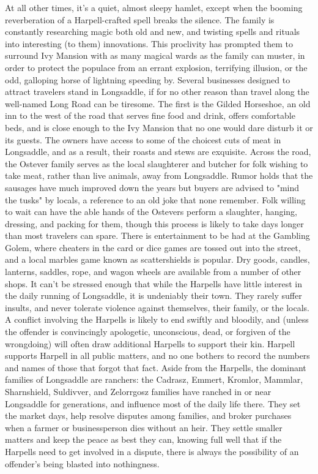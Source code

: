 \documentclass[10pt,a4paper,twoside,twocolumn,openany,bg=print,nodeprecatedcode]{dndbook}
\begin{document}
At all other times, it's a quiet, almost sleepy hamlet, except when the booming reverberation of a Harpell-crafted spell breaks the silence. The family is constantly researching magic both old and new, and twisting spells and rituals into interesting (to them) innovations. This proclivity has prompted them to surround Ivy Mansion with as many magical wards as the family can muster, in order to protect the populace from an errant explosion, terrifying illusion, or the odd, galloping horse of lightning speeding by.
Several businesses designed to attract travelers stand in Longsaddle, if for no other reason than travel along the well-named Long Road can be tiresome. The first is the Gilded Horseshoe, an old inn to the west of the road that serves fine food and drink, offers comfortable beds, and is close enough to the Ivy Mansion that no one would dare disturb it or its guests. The owners have access to some of the choicest cuts of meat in Longsaddle, and as a result, their roasts and stews are exquisite.
Across the road, the Ostever family serves as the local slaughterer and butcher for folk wishing to take meat, rather than live animals, away from Longsaddle. Rumor holds that the sausages have much improved down the years but buyers are advised to "mind the tusks" by locals, a reference to an old joke that none remember. Folk willing to wait can have the able hands of the Ostevers perform a slaughter, hanging, dressing, and packing for them, though this process is likely to take days longer than most travelers can spare.
There is entertainment to be had at the Gambling Golem, where cheaters in the card or dice games are tossed out into the street, and a local marbles game known as scattershields is popular. Dry goods, candles, lanterns, saddles, rope, and wagon wheels are available from a number of other shops.
It can't be stressed enough that while the Harpells have little interest in the daily running of Longsaddle, it is undeniably their town. They rarely suffer insults, and never tolerate violence against themselves, their family, or the locals. A conflict involving the Harpells is likely to end swiftly and bloodily, and (unless the offender is convincingly apologetic, unconscious, dead, or forgiven of the wrongdoing) will often draw additional Harpells to support their kin. Harpell supports Harpell in all public matters, and no one bothers to record the numbers and names of those that forgot that fact.
Aside from the Harpells, the dominant families of Longsaddle are ranchers: the Cadrasz, Emmert, Kromlor, Mammlar, Sharnshield, Suldivver, and Zelorrgosz families have ranched in or near Longsaddle for generations, and influence most of the daily life there. They set the market days, help resolve disputes among families, and broker purchases when a farmer or businessperson dies without an heir. They settle smaller matters and keep the peace as best they can, knowing full well that if the Harpells need to get involved in a dispute, there is always the possibility of an offender's being blasted into nothingness.
\end{document}
